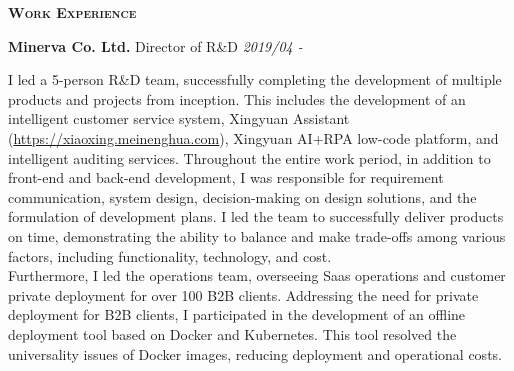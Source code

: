 \documentclass[a4paper]{article}
\newenvironment{changemargin}[2]{%
  \begin{list}{}{%
    \setlength{\topsep}{0pt}%
    \setlength{\leftmargin}{#1}%
    \setlength{\rightmargin}{#2}%
    \setlength{\listparindent}{\parindent}%
    \setlength{\itemindent}{\parindent}%
    \setlength{\parsep}{\parskip}%
  }%
  \item[]}{\end{list}
}
\newcommand{\lineover}{
	\begin{changemargin}{-0.05in}{-0.05in}
		\vspace*{-8pt}
		\hrulefill \\
		\vspace*{-2pt}
	\end{changemargin}
}
\newcommand{\header}[1]{
	\begin{changemargin}{-0.5in}{-0.5in}
		\scshape{\large \textbf{#1}}\\
	\end{changemargin}
}
\newenvironment{body} {
	\vspace*{-16pt}
	\begin{changemargin}{-0.5in}{-0.5in}
  }
	{\end{changemargin}
}
\begin{document}
\header{Work Experience}
\begin{body}
	\vspace{16pt}
	\textbf{Minerva Co. Ltd.} \hfill Director of R\&D \emph{2019/04 - } \\

	\begin{justify}
		I led a 5-person R\&D team, successfully completing the development of multiple products and projects from inception. This includes the development of an intelligent customer service system, Xingyuan Assistant (\url{https://xiaoxing.meinenghua.com}), Xingyuan AI+RPA low-code platform, and intelligent auditing services. Throughout the entire work period, in addition to front-end and back-end development, I was responsible for requirement communication, system design, decision-making on design solutions, and the formulation of development plans. I led the team to successfully deliver products on time, demonstrating the ability to balance and make trade-offs among various factors, including functionality, technology, and cost.\\
		Furthermore, I led the operations team, overseeing Saas operations and customer private deployment for over 100 B2B clients. Addressing the need for private deployment for B2B clients, I participated in the development of an offline deployment tool based on Docker and Kubernetes. This tool resolved the universality issues of Docker images, reducing deployment and operational costs.
	\end{justify}





\end{body}
\end{document}
